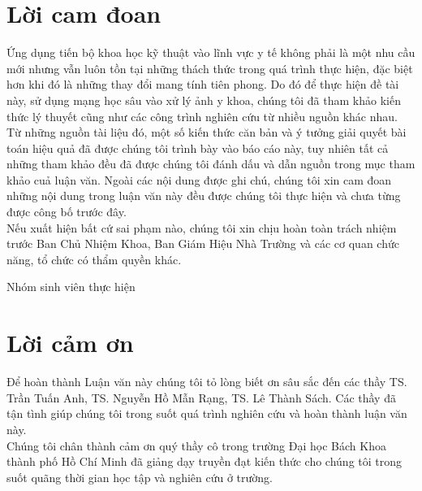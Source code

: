 \documentclass[12pt,a4paper,oneside]{book} %
\begin{document}

\coverpage

\frontmatter

\chapter*{Lời cam đoan}
\noindent 
Ứng dụng tiến bộ khoa học kỹ thuật vào lĩnh vực y tế không phải là một nhu cầu mới nhưng vẫn luôn tồn tại những thách thức trong quá trình thực hiện, đặc biệt hơn khi đó là những thay đổi mang tính tiên phong. Do đó để thực hiện đề tài này, sử dụng mạng học sâu vào xử lý ảnh y khoa, chúng tôi đã tham khảo kiến thức lý thuyết cũng như các công trình nghiên cứu từ nhiều nguồn khác nhau. Từ những nguồn tài liệu đó, một số kiến thức căn bản và ý tưởng giải quyết bài toán hiệu quả đã được chúng tôi trình bày vào báo cáo này, tuy nhiên tất cả những tham khảo đều đã được chúng tôi đánh dấu và dẫn nguồn trong mục tham khảo cuả luận văn. Ngoài các nội dung được ghi chú, chúng tôi xin cam đoan những nội dung trong luận văn này đều được chúng tôi thực hiện và chưa từng được công bố trước đây. \\

Nếu xuất hiện bất cứ sai phạm nào, chúng tôi xin chịu hoàn toàn trách nhiệm trước Ban Chủ Nhiệm Khoa, Ban Giám Hiệu Nhà Trường và các cơ quan chức năng, tổ chức có thẩm quyền khác.
\begin{flushright}
Nhóm sinh viên thực hiện
\end{flushright}
\chapter*{Lời cảm ơn}

Để hoàn thành Luận văn này chúng tôi tỏ lòng biết ơn sâu sắc đến các thầy TS. Trần Tuấn Anh, TS. Nguyễn Hồ Mẫn Rạng, TS. Lê Thành Sách. Các thầy đã tận tình giúp chúng tôi trong suốt quá trình nghiên cứu và hoàn thành luận văn này.\\

Chúng tôi chân thành cảm ơn quý thầy cô trong trường Đại học Bách Khoa thành phố Hồ Chí Minh đã giảng dạy truyền đạt kiến thức cho chúng tôi trong suốt quãng thời gian học tập và nghiên cứu ở trường. \\
\end{document}
